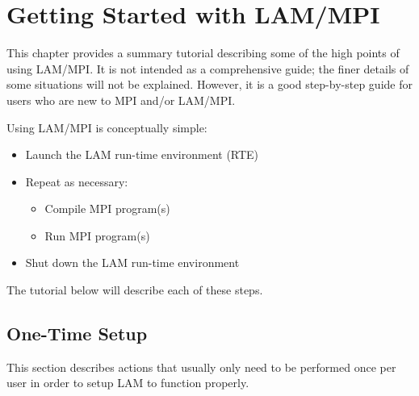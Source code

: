 %
% 
%
%

\chapter{Getting Started with LAM/MPI}
\label{sec:getting-started}

This chapter provides a summary tutorial describing some of the high
points of using LAM/MPI.  It is not intended as a comprehensive guide;
the finer details of some situations will not be explained.  However,
it is a good step-by-step guide for users who are new to MPI and/or
LAM/MPI.

Using LAM/MPI is conceptually simple:

\begin{itemize}
\item Launch the LAM run-time environment (RTE)
\item Repeat as necessary:
  \begin{itemize}
  \item Compile MPI program(s)
  \item Run MPI program(s)
  \end{itemize}
\item Shut down the LAM run-time environment
\end{itemize}

The tutorial below will describe each of these steps.  


\section{One-Time Setup}

This section describes actions that usually only need to be performed
once per user in order to setup LAM to function properly.

